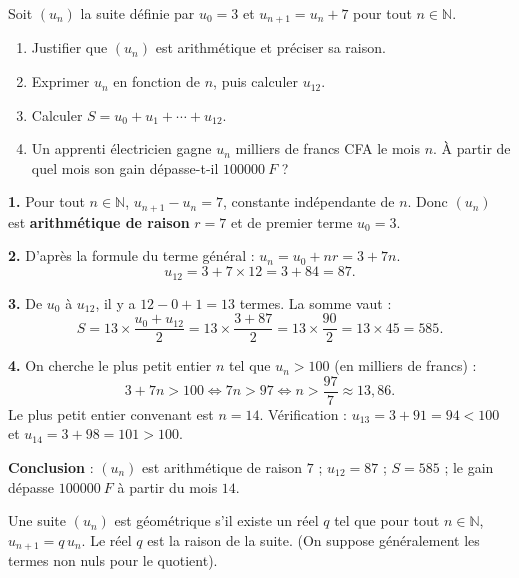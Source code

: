 \documentclass[11pt]{article}
\newcommand{\cle}[1]{{\popxbold\color{popdark}#1}}
\newcounter{popsec}
\newcounter{popsub}
\newcommand{\courssub}[1]{%
  \stepcounter{popsub}%
  \par\vspace{9pt}\noindent{\popxbold\fontsize{11.5}{13}\selectfont\color{popink}{\color{poporange}\thepopsec.\thepopsub}\hspace{6pt}#1}\par\nopagebreak\vspace{4pt}
}
\begin{document}
\begin{exoresolu}
Soit $(u_n)$ la suite définie par $u_0=3$ et $u_{n+1}=u_n+7$ pour tout $n\in\mathbb{N}$.
\begin{enumerate}
\item Justifier que $(u_n)$ est arithmétique et préciser sa raison.
\item Exprimer $u_n$ en fonction de $n$, puis calculer $u_{12}$.
\item Calculer $S=u_0+u_1+\cdots+u_{12}$.
\item Un apprenti électricien gagne $u_n$ milliers de francs CFA le mois $n$. À partir de quel mois son gain dépasse-t-il $\SI{100000}{F}$ ?
\end{enumerate}
\tcblower
\textbf{1.} Pour tout $n\in\mathbb{N}$, $u_{n+1}-u_n=7$, constante indépendante de $n$. Donc $(u_n)$ est \textbf{arithmétique de raison} $r=7$ et de premier terme $u_0=3$.

\textbf{2.} D'après la formule du terme général : $u_n=u_0+nr=3+7n$.
\[u_{12}=3+7\times 12=3+84=87.\]

\textbf{3.} De $u_0$ à $u_{12}$, il y a $12-0+1 = 13$ termes. La somme vaut :
\[S=13\times\frac{u_0+u_{12}}{2}=13\times\frac{3+87}{2}=13\times\frac{90}{2}=13\times 45=585.\]

\textbf{4.} On cherche le plus petit entier $n$ tel que $u_n>100$ (en milliers de francs) :
\[3+7n>100 \iff 7n>97 \iff n>\frac{97}{7}\approx 13,86.\]
Le plus petit entier convenant est $n=14$. Vérification : $u_{13}=3+91=94<100$ et $u_{14}=3+98=101>100$.

\textbf{Conclusion} : $(u_n)$ est arithmétique de raison $7$ ; $u_{12}=87$ ; $S=585$ ; le gain dépasse $\SI{100000}{F}$ à partir du mois $14$.
\end{exoresolu}

\courssub{Suites géométriques}

\begin{definition}
Une suite $(u_n)$ est \cle{géométrique} s'il existe un réel $q$ tel que pour tout $n\in\mathbb{N}$, $u_{n+1}=q\,u_n$. Le réel $q$ est la \cle{raison} de la suite. (On suppose généralement les termes non nuls pour le quotient).
\end{definition}
\end{document}
